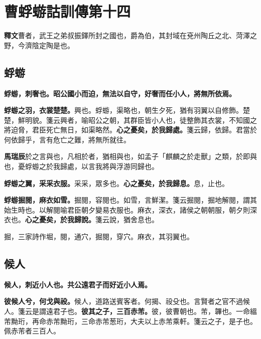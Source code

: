 \chapter{曹蜉蝣詁訓傳第十四}

\begin{quoting}\textbf{釋文}曹者，武王之弟叔振鐸所封之國也，爵為伯，其封域在兗州陶丘之北、菏澤之野，今濟陰定陶是也。\end{quoting}

\section{蜉蝣}


\textbf{蜉蝣，刺奢也。昭公國小而迫，無法以自守，好奢而任小人，將無所依焉。}

\textbf{蜉蝣之羽，衣裳楚楚。}{\footnotesize 興也。蜉蝣，渠略也，朝生夕死，猶有羽翼以自修飾。楚楚，鮮明貌。箋云興者，喻昭公之朝，其群臣皆小人也，徒整飾其衣裳，不知國之將迫脅，君臣死亡無日，如渠略然。}\textbf{心之憂矣，於我歸處。}{\footnotesize 箋云歸，依歸。君當於何依歸乎，言有危亡之難，將無所就往。}

\begin{quoting}\textbf{馬瑞辰}於之言與也，凡相於者，猶相與也，如孟子「麒麟之於走獸」之類，於即與也，憂蜉蝣之於我歸處，以言我將與浮游同歸也。\end{quoting}

\textbf{蜉蝣之翼，采采衣服。}{\footnotesize 采采，眾多也。}\textbf{心之憂矣，於我歸息。}{\footnotesize 息，止也。}

\textbf{蜉蝣掘閱，麻衣如雪。}{\footnotesize 掘閱，容閱也。如雪，言鮮潔。箋云掘閱，掘地解閱，謂其始生時也。以解閱喻君臣朝夕變易衣服也。麻衣，深衣，諸侯之朝朝服，朝夕則深衣也。}\textbf{心之憂矣，於我歸說。}{\footnotesize 箋云說，猶舍息也。}

\begin{quoting}掘，三家詩作堀，閱，通穴，掘閱，穿穴。麻衣，其羽翼也。\end{quoting}

\section{候人}


\textbf{候人，刺近小人也。共公遠君子而好近小人焉。}

\textbf{彼候人兮，何戈與祋。}{\footnotesize 候人，道路送賓客者。何揭、祋殳也。言賢者之官不過候人。箋云是謂遠君子也。}\textbf{彼其之子，三百赤芾。}{\footnotesize 彼，彼曹朝也。芾，韠也。一命縕芾黝珩，再命赤芾黝珩，三命赤芾葱珩，大夫以上赤芾乘軒。箋云之子，是子也。佩赤芾者三百人。}

